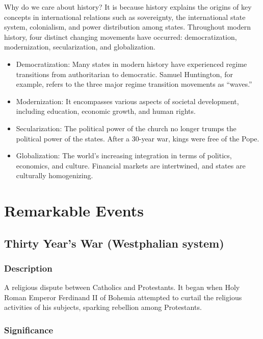 \documentclass[
]{book}
\begin{document}
Why do we care about history? It is because history explains the origins of key concepts in international relations such as sovereignty, the international state system, colonialism, and power distribution among states. Throughout modern history, four distinct changing movements have occurred: democratization, modernization, secularization, and globalization.

\begin{itemize}
\item
  Democratization: Many states in modern history have experienced regime transitions from authoritarian to democratic. Samuel Huntington, for example, refers to the three major regime transition movements as ``waves.''
\item
  Modernization: It encompasses various aspects of societal development, including education, economic growth, and human rights.
\item
  Secularization: The political power of the church no longer trumps the political power of the states. After a 30-year war, kings were free of the Pope.
\item
  Globalization: The world's increasing integration in terms of politics, economics, and culture. Financial markets are intertwined, and states are culturally homogenizing.
\end{itemize}

\hypertarget{remarkable-events}{%
\section{Remarkable Events}\label{remarkable-events}}

\hypertarget{thirty-years-war-westphalian-system}{%
\subsection{Thirty Year's War (Westphalian system)}\label{thirty-years-war-westphalian-system}}

\hypertarget{description-1}{%
\subsubsection{Description}\label{description-1}}

A religious dispute between Catholics and Protestants. It began when Holy Roman Emperor Ferdinand II of Bohemia attempted to curtail the religious activities of his subjects, sparking rebellion among Protestants.

\hypertarget{significance-1}{%
\subsubsection{Significance}\label{significance-1}}
\end{document}
